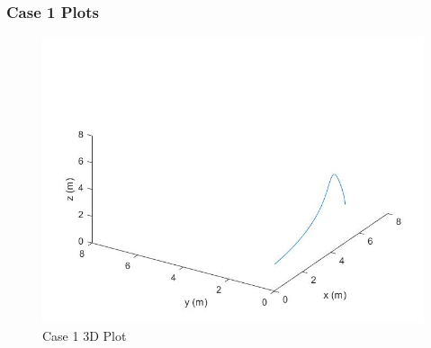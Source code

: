 \documentclass[12pt,twoside,letterpaper]{article}
\begin{document}
\subsubsection{Case 1 Plots}
\begin{figure}[H]
\centering
\includegraphics[width=15cm]{figures/case_1_3D.jpg}
\caption{Case 1 3D Plot}
\label{Case 1 3D Plot}
\end{figure}
\end{document}

